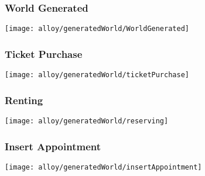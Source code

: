 	\begin{landscape}
		\subsubsection{World Generated}
			\texttt{[image: alloy/generatedWorld/WorldGenerated]}
	
		\subsubsection{Ticket Purchase}
			\texttt{[image: alloy/generatedWorld/ticketPurchase]}
	
		\subsubsection{Renting}
			\texttt{[image: alloy/generatedWorld/reserving]}
		
		\subsubsection{Insert Appointment}
			\texttt{[image: alloy/generatedWorld/insertAppointment]}
	\end{landscape}
	
	
